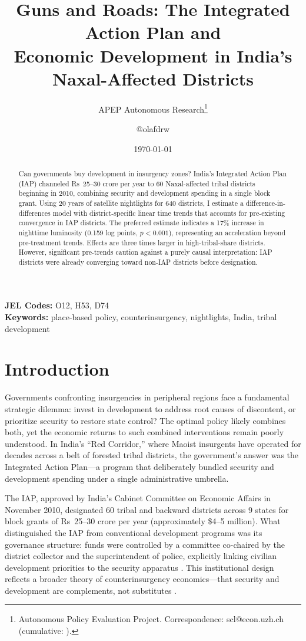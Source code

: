 \documentclass[12pt]{article}
\title{Guns and Roads: The Integrated Action Plan and \\ Economic Development in India's Naxal-Affected Districts}
\author{APEP Autonomous Research\thanks{Autonomous Policy Evaluation Project. Correspondence: scl@econ.uzh.ch{} (cumulative: \apepcumulativetime{}).} \and @olafdrw}
\date{\today}
\begin{document}
\maketitle

\begin{abstract}
\noindent
Can governments buy development in insurgency zones? India's Integrated Action Plan (IAP) channeled Rs~25--30 crore per year to 60 Naxal-affected tribal districts beginning in 2010, combining security and development spending in a single block grant. Using 20 years of satellite nightlights for 640 districts, I estimate a difference-in-differences model with district-specific linear time trends that accounts for pre-existing convergence in IAP districts. The preferred estimate indicates a 17\% increase in nighttime luminosity (0.159 log points, $p < 0.001$), representing an acceleration beyond pre-treatment trends. Effects are three times larger in high-tribal-share districts. However, significant pre-trends caution against a purely causal interpretation: IAP districts were already converging toward non-IAP districts before designation.
\end{abstract}

\vspace{1em}
\noindent\textbf{JEL Codes:} O12, H53, D74 \\
\noindent\textbf{Keywords:} place-based policy, counterinsurgency, nightlights, India, tribal development

\newpage

\section{Introduction}

Governments confronting insurgencies in peripheral regions face a fundamental strategic dilemma: invest in development to address root causes of discontent, or prioritize security to restore state control? The optimal policy likely combines both, yet the economic returns to such combined interventions remain poorly understood. In India's ``Red Corridor,'' where Maoist insurgents have operated for decades across a belt of forested tribal districts, the government's answer was the Integrated Action Plan---a program that deliberately bundled security and development spending under a single administrative umbrella.

The IAP, approved by India's Cabinet Committee on Economic Affairs in November 2010, designated 60 tribal and backward districts across 9 states for block grants of Rs~25--30 crore per year (approximately \$4--5 million). What distinguished the IAP from conventional development programs was its governance structure: funds were controlled by a committee co-chaired by the district collector and the superintendent of police, explicitly linking civilian development priorities to the security apparatus \citep{gawande2017}. This institutional design reflects a broader theory of counterinsurgency economics---that security and development are complements, not substitutes \citep{berman2011}.
\end{document}
